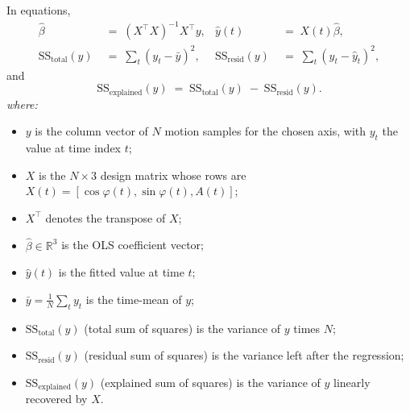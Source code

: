 \documentclass[11pt]{article}
\newcommand{\SSE}{\mathrm{SS_{explained}}}
\newcommand{\SST}{\mathrm{SS_{total}}}
\newcommand{\SSR}{\mathrm{SS_{resid}}}
\begin{document}
In equations,
\begin{align}
\hat\beta &\;=\; (X^\top X)^{-1} X^\top y,
&
\hat y(t) &\;=\; X(t)\hat\beta,\\
\SST(y) &\;=\; \sum_t (y_t - \bar y)^{2},
&
\SSR(y) &\;=\; \sum_t (y_t - \hat y_t)^{2},
\end{align}
and
\begin{equation}
\SSE(y) \;=\; \SST(y) \;-\; \SSR(y).
\end{equation}
\textit{where:}
\begin{itemize}\setlength{\itemsep}{1pt}
\item $y$ is the column vector of $N$ motion samples for the chosen axis,
with $y_t$ the value at time index $t$;
\item $X$ is the $N \times 3$ design matrix whose rows are
$X(t) = [\cos\varphi(t),\sin\varphi(t),A(t)]$;
\item $X^\top$ denotes the transpose of $X$;
\item $\hat\beta \in \mathbb{R}^3$ is the OLS coefficient vector;
\item $\hat y(t)$ is the fitted value at time $t$;
\item $\bar y = \tfrac{1}{N}\sum_t y_t$ is the time-mean of $y$;
\item $\SST(y)$ (total sum of squares) is the variance of $y$ times $N$;
\item $\SSR(y)$ (residual sum of squares) is the variance left after
the regression;
\item $\SSE(y)$ (explained sum of squares) is the variance of $y$
linearly recovered by $X$.
\end{itemize}
\end{document}
